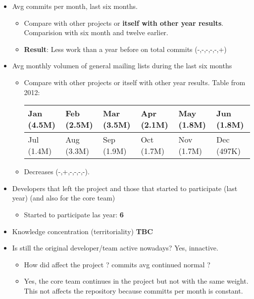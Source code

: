 \documentclass[11pt]{scrartcl}
\begin{document}
\begin{itemize}
    \item Avg commits per month, last six months.
        \begin{itemize}
            \item Compare with other projects or \textbf{itself with other year results}. Comparision with six month and twelve earlier.
            \item \textbf{Result}: Less work than a year before on total commits (-,-,-,-,-,+)
        \end{itemize}
    \item Avg monthly volumen of general mailing lists during the last six months
    \begin{itemize}
        \item Compare with other projects or itself with other year results. Table from 2012:

            \begin{tabular}{|l|l|l|l|l|l|}
                \hline
        	    Jan (4.5M) & Feb (2.5M) & Mar (3.5M) & Apr (2.1M) & May (1.8M) & Jun (1.8M)\\
                \hline
                Jul (1.4M) & Aug (3.3M) & Sep (1.9M) & Oct (1.7M) & Nov (1.7M) & Dec (497K)\\
                \hline
            \end{tabular}
        \item Decreases (-,+,-,-,-,-).
    \end{itemize}
    \item Developers that left the project and those that started to participate (last year) (and also for the core team)
    \begin{itemize}
        \item Started to participate las year: \textbf{6}
    \end{itemize}
    \item Knowledge concentration (territoriality) \textbf{TBC}
    \item Is still the original developer/team active nowadays? Yes, innactive.
    \begin{itemize}
        \item How did affect the project ? commits avg continued normal ?
        \item Yes, the core team continues in the project but not with the same weight. This not affects the repository because committs per month is constant.
    \end{itemize}
\end{itemize}
\end{document}

